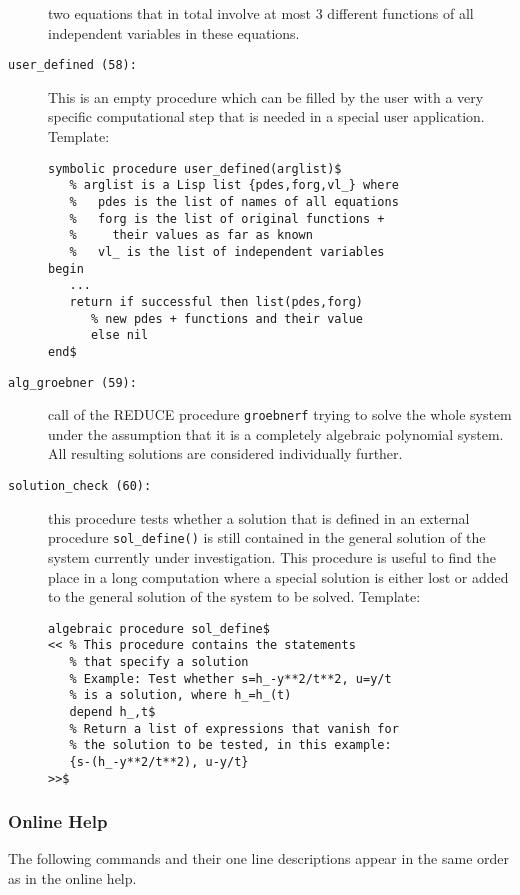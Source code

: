 \begin{description}
  two equations that in total involve at most 3 different functions of
  all independent variables in these equations.
  \label{crack-m_58}
\item[\texttt{user\_defined (58):}] This is an empty procedure which can
  be filled by the user with a very specific computational step that
  is needed in a special user application.  Template:
\begin{verbatim}
symbolic procedure user_defined(arglist)$
   % arglist is a Lisp list {pdes,forg,vl_} where
   %   pdes is the list of names of all equations
   %   forg is the list of original functions +
   %     their values as far as known
   %   vl_ is the list of independent variables
begin
   ...
   return if successful then list(pdes,forg)
      % new pdes + functions and their value
      else nil
end$
\end{verbatim}
\label{crack-m_59}
\item[\texttt{alg\_groebner (59):}] call of the REDUCE procedure
  \texttt{groebnerf} trying to solve the whole system under the
  assumption that it is a completely algebraic polynomial system.  All
  resulting solutions are considered individually further.
  \label{crack-m_60}
\item[\texttt{solution\_check (60):}] this procedure tests whether a
  solution that is defined in an external procedure
  \texttt{sol\_define()} is still contained in the general solution of
  the system currently under investigation.  This procedure is useful
  to find the place in a long computation where a special solution is
  either lost or added to the general solution of the system to be
  solved.  Template:
\begin{verbatim}
algebraic procedure sol_define$
<< % This procedure contains the statements
   % that specify a solution
   % Example: Test whether s=h_-y**2/t**2, u=y/t
   % is a solution, where h_=h_(t)
   depend h_,t$
   % Return a list of expressions that vanish for
   % the solution to be tested, in this example:
   {s-(h_-y**2/t**2), u-y/t}
>>$
\end{verbatim}
\end{description}

\subsubsection{Online Help}

The following commands and their one line descriptions appear in the
same order as in the online help.


